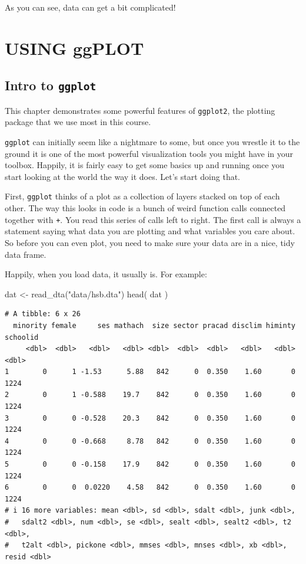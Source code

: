 \documentclass[
  letterpaper,
  DIV=11,
  numbers=noendperiod]{scrreprt}
\newenvironment{Shaded}{}{}
\newcommand{\FunctionTok}[1]{\textcolor[rgb]{0.02,0.16,0.49}{#1}}
\newcommand{\NormalTok}[1]{#1}
\newcommand{\OtherTok}[1]{\textcolor[rgb]{0.00,0.44,0.13}{#1}}
\newcommand{\StringTok}[1]{\textcolor[rgb]{0.25,0.44,0.63}{#1}}
\begin{document}
As you can see, data can get a bit complicated!

\part{USING ggPLOT}

\chapter{\texorpdfstring{Intro to
\texttt{ggplot}}{Intro to ggplot}}\label{intro-to-ggplot}

This chapter demonstrates some powerful features of \texttt{ggplot2},
the plotting package that we use most in this course.

\texttt{ggplot} can initially seem like a nightmare to some, but once
you wrestle it to the ground it is one of the most powerful
visualization tools you might have in your toolbox. Happily, it is
fairly easy to get some basics up and running once you start looking at
the world the way it does. Let's start doing that.

First, \texttt{ggplot} thinks of a plot as a collection of layers
stacked on top of each other. The way this looks in code is a bunch of
weird function calls connected together with \texttt{+}. You read this
series of calls left to right. The first call is always a statement
saying what data you are plotting and what variables you care about. So
before you can even plot, you need to make sure your data are in a nice,
tidy data frame.

Happily, when you load data, it usually is. For example:

\begin{Shaded}
\begin{Highlighting}[]
\NormalTok{dat }\OtherTok{\textless{}{-}} \FunctionTok{read\_dta}\NormalTok{(}\StringTok{"data/hsb.dta"}\NormalTok{)}
\FunctionTok{head}\NormalTok{( dat )}
\end{Highlighting}
\end{Shaded}

\begin{verbatim}
# A tibble: 6 x 26
  minority female     ses mathach  size sector pracad disclim himinty schoolid
     <dbl>  <dbl>   <dbl>   <dbl> <dbl>  <dbl>  <dbl>   <dbl>   <dbl>    <dbl>
1        0      1 -1.53      5.88   842      0  0.350    1.60       0     1224
2        0      1 -0.588    19.7    842      0  0.350    1.60       0     1224
3        0      0 -0.528    20.3    842      0  0.350    1.60       0     1224
4        0      0 -0.668     8.78   842      0  0.350    1.60       0     1224
5        0      0 -0.158    17.9    842      0  0.350    1.60       0     1224
6        0      0  0.0220    4.58   842      0  0.350    1.60       0     1224
# i 16 more variables: mean <dbl>, sd <dbl>, sdalt <dbl>, junk <dbl>,
#   sdalt2 <dbl>, num <dbl>, se <dbl>, sealt <dbl>, sealt2 <dbl>, t2 <dbl>,
#   t2alt <dbl>, pickone <dbl>, mmses <dbl>, mnses <dbl>, xb <dbl>, resid <dbl>
\end{verbatim}
\end{document}
